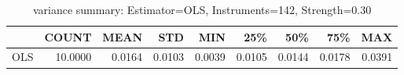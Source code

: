 \begin{table}[ht]
\centering
\caption{variance summary: Estimator=OLS, Instruments=142, Strength=0.30}
\begin{tabular}{lrrrrrrrr}
\toprule
 & COUNT & MEAN & STD & MIN & 25\% & 50\% & 75\% & MAX \\
\midrule
OLS & 10.0000 & 0.0164 & 0.0103 & 0.0039 & 0.0105 & 0.0144 & 0.0178 & 0.0391 \\
\bottomrule
\end{tabular}
\end{table}
